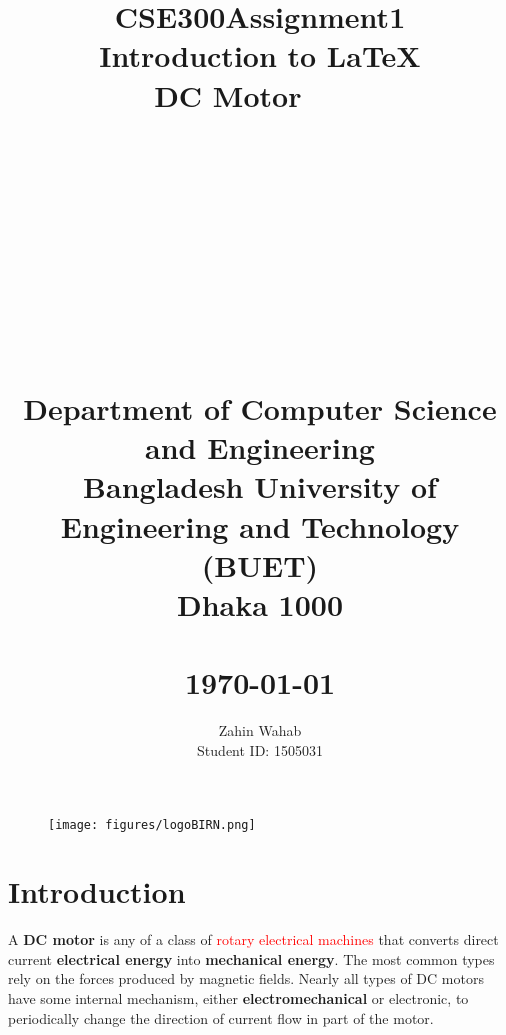 \documentclass{article}
\begin{document}
\begin{titlepage}

\author{Zahin Wahab\\Student ID: 1505031}
\title{CSE300\textunderscore Assignment1\\Introduction to \LaTeX\\
\huge DC Motor}
\date{}
\maketitle
\title{~~~~\\~~~\\~~~~\\~~~\\~~~~~\\~~~~\\~~~~\\~~~~~\\}
\maketitle
\begin{figure}[h]
 \centering
 \texttt{[image: figures/logoBIRN.png]}
 \end{figure}
 

        \title{ 
         \centering 
         \Large Department of Computer Science and Engineering\\
         \centering
         Bangladesh University of Engineering and Technology\\
         \centering(BUET)\\
          \centering Dhaka 1000\\
          ~~~~~~\\
          \centering \today \\}
          
          \maketitle
          
    


 

\end{titlepage}


\newpage
\tableofcontents
\newpage
\section{Introduction}
\label{sec:intro}

A \textbf{DC motor} is any of a class of \textcolor{red}{rotary electrical machines} that converts direct current \textbf{electrical energy} into \textbf{mechanical energy}. The most common types rely on the forces produced by magnetic fields. Nearly all types of DC motors have some internal mechanism, either \textbf{electromechanical} or electronic, to periodically change the direction of current flow in part of the motor.
\end{document}

